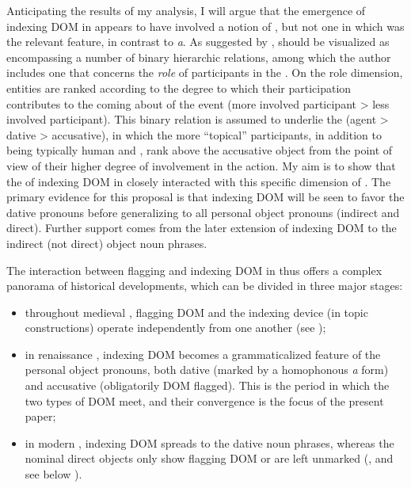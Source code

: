 \documentclass[output=paper]{LSP/langsci}
\begin{document}
 Anticipating the results of my analysis, I will argue that the emergence of indexing DOM in  appears to have involved a notion of , but not one in which  was the relevant feature, in contrast to \textit{a}. As suggested by \citet[152]{Givon1976Topic},  should be visualized as encompassing a number of binary hierarchic relations, among which the author includes one that concerns the \textit{role} of participants in the . On the role dimension, entities are ranked according to the degree to which their participation contributes to the coming about of the event (more involved participant > less involved participant). This binary relation is assumed to underlie the  (agent > dative > accusative), in which the more “topical” participants, in addition to being typically human and , rank above the accusative object from the point of view of their higher degree of involvement in the action. My aim is to show that the  of indexing DOM in  closely interacted with this specific dimension of . The primary evidence for this proposal is that  indexing DOM will be seen to favor the dative pronouns before generalizing to all personal object pronouns (indirect and direct). Further support comes from the later extension of indexing DOM to the indirect (not direct) object noun phrases. 

 The interaction between flagging and indexing DOM in  thus offers a complex panorama of historical developments, which can be divided in three major stages:


\begin{itemize}
\item \begin{styleListParagraph}
throughout medieval , flagging DOM and the indexing device (in topic constructions) operate independently from one another (see  );
\end{styleListParagraph}
\item \begin{styleListParagraph}
in renaissance , indexing DOM becomes a grammaticalized feature of the personal object pronouns, both dative (marked by a homophonous \textit{a} form) and accusative (obligatorily DOM flagged). This is the period in which the two types of DOM meet, and their convergence is the focus of the present paper;
\end{styleListParagraph}
\item \begin{styleListParagraph}
in modern , indexing DOM spreads to the dative noun phrases, whereas the nominal direct objects only show flagging DOM or are left unmarked (\citealt{Melisetal2009Interplay}, and see below  ).
\end{styleListParagraph}
\end{itemize}
\end{document}
